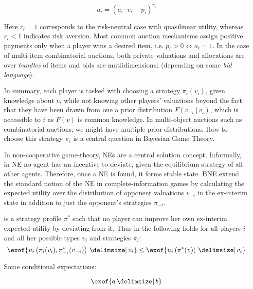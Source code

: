    $$u_i = \left(a_i\cdot v_i - p_i\right)^{r_i}$$


    Here $r_i = 1$ corresponds to the risk-neutral case with quasilinear utility, whereas $r_i < 1$ indicates risk aversion. Most common auction mechanisms assign positive payments only when a player wins a desired item, i.e. $p_i > 0 \Leftrightarrow a_i=1$. In the case of multi-item combinatorial auctions, both private valuations and allocations are over \emph{bundles} of items and bids are mutlidimensional (depending on some \emph{bid language}). 

    In summary, each player is tasked with choosing a strategy $\pi_i(v_i)$, given knowledge about $v_i$ while not knowing other players' valuations beyond the fact that they have been drawn from one a prior distribution $F(v_{-i}\ \vert\ v_i)$, which is accessible to $i$ as $F(v)$ is common knowledge. In multi-object auctions such as combinatorial auctions, we might have multiple prior distributions. How to choose this strategy $\pi_i$ is a central question in Bayesian Game Theory. 

    
    In non-cooperative game-theory, \acp{NE} \citep{nashEquilibriumPointsNperson1950} are a central solution concept. Informally, in NE no agent has an incentive to deviate, given the equilibrium strategy of all other agents. Therefore, once a NE is found, it forms stable state. BNE extend the standard notion of the \ac{NE} in complete-information games by calculating the expected utility over the distribution of opponent valuations $v_{-i}$ in the ex-interim state in addition to just the opponent's strategies $\pi_{-i}$.  

     is a strategy profile $\pi^*$ such that no player can improve her own ex-interim expected utility by deviating from it. Thus in  the following holds for all players $i$ and all her possible types $v_i$ and strategies $\pi_i$:
    \begin{equation*}
        \exof{u_i\left(\pi_i(v_i), \pi^*_{-i}(v_{-i})\right) \given v_i} \leq \exof{u_i\left(\pi^*(v)\right) \given v_i}
    \end{equation*}


    Some conditional expectations:

    \begin{equation*}
      \exof{a \given b}
    \end{equation*}


